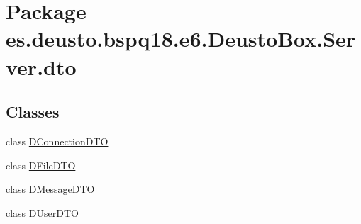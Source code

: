 \hypertarget{namespacees_1_1deusto_1_1bspq18_1_1e6_1_1_deusto_box_1_1_server_1_1dto}{}\section{Package es.\+deusto.\+bspq18.\+e6.\+Deusto\+Box.\+Server.\+dto}
\label{namespacees_1_1deusto_1_1bspq18_1_1e6_1_1_deusto_box_1_1_server_1_1dto}
\subsection*{Classes}
\begin{DoxyCompactItemize}
\item 
class \mbox{\hyperlink{classes_1_1deusto_1_1bspq18_1_1e6_1_1_deusto_box_1_1_server_1_1dto_1_1_d_connection_d_t_o}{D\+Connection\+D\+TO}}
\item 
class \mbox{\hyperlink{classes_1_1deusto_1_1bspq18_1_1e6_1_1_deusto_box_1_1_server_1_1dto_1_1_d_file_d_t_o}{D\+File\+D\+TO}}
\item 
class \mbox{\hyperlink{classes_1_1deusto_1_1bspq18_1_1e6_1_1_deusto_box_1_1_server_1_1dto_1_1_d_message_d_t_o}{D\+Message\+D\+TO}}
\item 
class \mbox{\hyperlink{classes_1_1deusto_1_1bspq18_1_1e6_1_1_deusto_box_1_1_server_1_1dto_1_1_d_user_d_t_o}{D\+User\+D\+TO}}
\end{DoxyCompactItemize}
